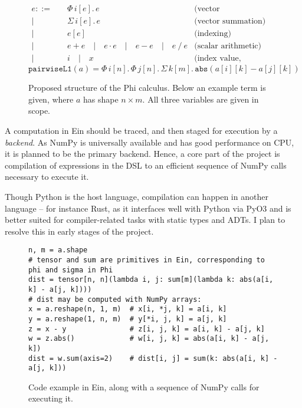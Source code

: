 \begin{figure}[h]
    \centering
    \begin{align*}
        e ::=& \quad \Phi\, i[e].\, e & \text{(vector comprehension)} \\
        |& \quad \Sigma\, i[e].\, e  & \text{(vector summation)} \\
        |& \quad e[e]  & \text{(indexing)} \\
        |& \quad e + e \quad | \quad e \cdot e \quad | \quad e - e \quad | \quad e \mathop{/} e   & \text{(scalar arithmetic)} \\
        |& \quad i \quad | \quad x &\text{(index value, variable)}
    \end{align*} 
    $$ \texttt{pairwiseL1}(a) = \Phi \,i[n].\, \Phi \,j[n].\, \Sigma\, k[m].\,
    \texttt{abs}\left( a[i][k] - a[j][k] \right) $$
    \caption{Proposed structure of the Phi calculus. Below an example term is given, where $a$ has shape $n \times m$. All three variables are given in scope.}
    \label{fig:phi-calculus}
\end{figure}
A computation in Ein should be traced, and then staged for execution by a \textit{backend}. As NumPy is universally available and has good performance on CPU, it is planned to be the primary backend. Hence, a core part of the project is compilation of expressions in the DSL to an efficient sequence of NumPy calls necessary to execute it.

Though Python is the host language, compilation can happen in another language -- for instance Rust, as it interfaces well with Python via PyO3  and is better suited for compiler-related tasks with static types and ADTs. I plan to resolve this in early stages of the project.

\begin{figure}[h]
    \centering
    \begin{verbatim}
n, m = a.shape
# tensor and sum are primitives in Ein, corresponding to phi and sigma in Phi
dist = tensor[n, n](lambda i, j: sum[m](lambda k: abs(a[i, k] - a[j, k])))
# dist may be computed with NumPy arrays:
x = a.reshape(n, 1, m)  # x[i, *j, k] = a[i, k]
y = a.reshape(1, n, m)  # y[*i, j, k] = a[j, k]
z = x - y               # z[i, j, k] = a[i, k] - a[j, k]
w = z.abs()             # w[i, j, k] = abs(a[i, k] - a[j, k])
dist = w.sum(axis=2)    # dist[i, j] = sum(k: abs(a[i, k] - a[j, k]))
\end{verbatim}
    \caption{Code example in Ein, along with a sequence of NumPy calls for executing it.}
    \label{fig:pairwise-l1-ein}
\end{figure}

